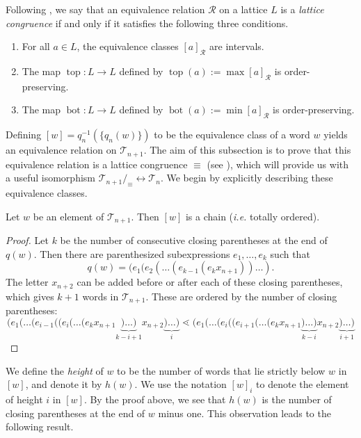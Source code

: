 \documentclass{preprint}
\newcommand{\topmap}{\operatorname{top}}
\newcommand{\botmap}{\operatorname{bot}}
\newcommand{\cR}{\mathcal{R}}
\newcommand{\cT}{\mathcal{T}}
\theoremstyle{definition}
\begin{document}
Following \cite[Section 2]{Reading}, we say that an equivalence relation $\cR$ on a lattice $L$ is a \emph{lattice congruence} if and only if it satisfies the following three conditions.
\begin{enumerate}[itemsep = 0pt]
    \item \label{item:latCong1} For all $a\in L$, the equivalence classes $[a]_\cR$ are intervals.
    \item \label{item:latCong2} The map $\topmap \colon L \to L$ defined by $\topmap(a) := \max [a]_\cR$ is order-preserving.
    \item \label{item:latCong3} The map $\botmap \colon L \to L$ defined by $\botmap(a) := \min [a]_\cR$ is order-preserving.
\end{enumerate}

Defining $[w] = q_n^{-1}(\{q_n(w)\})$ to be the equivalence class of a word $w$ yields an equivalence relation on $\cT_{n+1}$. The aim of this subsection is to prove that this equivalence relation is a lattice congruence $\equiv$ (see ), which will provide us with a useful isomorphism $ \cT_{n+1} /_\equiv \longleftrightarrow \cT_n$.
We begin by explicitly describing these equivalence classes.

\begin{lemma}\label{lem:chain}
    Let $w$ be an element of $\cT_{n+1}$. Then $[w]$ is a chain (\emph{i.e.} totally ordered).
\end{lemma}
\begin{proof}
Let $k$ be the number of consecutive closing parentheses at the end of $q(w)$. Then there are parenthesized subexpressions $e_1, \dots, e_k$ such that
\[
    q(w) = (e_1(e_2(\dots(e_{k-1}(e_kx_{n+1}))\dots).
\]
The letter $x_{n+2}$ can be added before or after each of these closing parentheses, which gives $k+1$ words in $\cT_{n+1}$. These are ordered by the number of closing parentheses:
\[
    (e_1(\dots(e_{i-1}((e_i(\dots(e_kx_{n+1}\underbrace{)\dots)}_{k-i+1}x_{n+2}\underbrace{)\dots)}_{i} \lessdot (e_1(\dots(e_i((e_{i+1}(\dots(e_kx_{n+1}\underbrace{)\dots)}_{k-i}x_{n+2}\underbrace{)\dots)}_{i+1}
\]
\end{proof}
We define the \emph{height} of $w$ to be the number of words that lie strictly below $w$ in $[w]$, and denote it by $h(w)$. We use the notation $[w]_i$ to denote the element of height $i$ in $[w]$. By the proof above, we see that $h(w)$ is the number of closing parentheses at the end of $w$ minus one. This observation leads to the following result.
\end{document}

